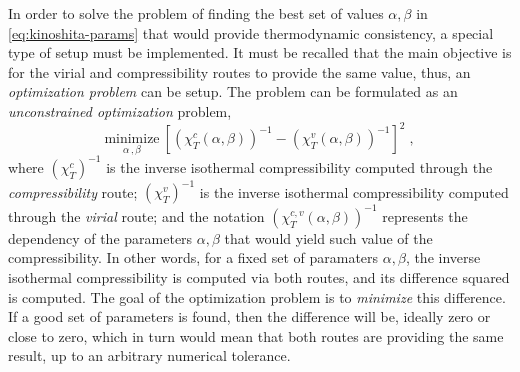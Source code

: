 In order to solve the problem of finding the best set of values \(\alpha, \beta\) in 
\autoref{eq:kinoshita-params} that would provide thermodynamic consistency, a special type 
of setup must be implemented. It must be recalled that the main objective is for the virial 
and compressibility routes to provide the same value, thus, an \emph{optimization problem} 
can be setup. The problem can be formulated as an \emph{unconstrained optimization} problem,
\begin{equation}
    \underset{\alpha \, , \beta}{\text{minimize}} \: {\left[
        {\left(\chi_{T}^{c} \left(\alpha, \beta\right) \right)}^{-1} - {\left(\chi_{T}^{v} \left(\alpha, \beta\right) \right)}^{-1} \right]}^2
    \; ,
    \label{eq:optimiziation-chi}
\end{equation}
where \({\left(\chi_{T}^{c}\right)}^{-1}\) is the inverse isothermal compressibility 
computed through the \emph{compressibility} route; \({\left(\chi_{T}^{v}\right)}^{-1}\) is 
the inverse isothermal compressibility computed through the \emph{virial} route; and the 
notation \({\left(\chi_{T}^{c, v} \left(\alpha, \beta\right) \right)}^{-1}\) represents the 
dependency of the parameters \(\alpha, \beta\) that would yield such value of the 
compressibility. In other words, for a fixed set of paramaters \(\alpha, \beta\), the 
inverse isothermal compressibility is computed via both routes, and its difference squared 
is computed. The goal of the optimization problem is to \emph{minimize} this difference. If 
a good set of parameters is found, then the difference will be, ideally zero or close to 
zero, which in turn would mean that both routes are providing the same result, up to an 
arbitrary numerical tolerance.

